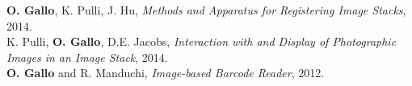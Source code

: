 \documentclass[10pt]{article}
\renewcommand{\section}[2]%
        {\pagebreak[2]\vspace{1.3\baselineskip}%
         \phantomsection\addcontentsline{toc}{section}{#1}%
         \hspace{0in}%
         \marginpar{
         \raggedright \scshape #1}#2}
\newcommand{\OG}{\textbf{O. Gallo}}
\begin{document}
\OG{}, K. Pulli, J. Hu, \emph{Methods and Apparatus for Registering Image Stacks}, 2014.\\

K. Pulli, \OG{}, D.E. Jacobs, \emph{Interaction with and Display of Photographic Images in an Image Stack}, 2014.\\

\OG{} and R. Manduchi, \emph{Image-based Barcode Reader}, 2012.\newline





\end{document}
